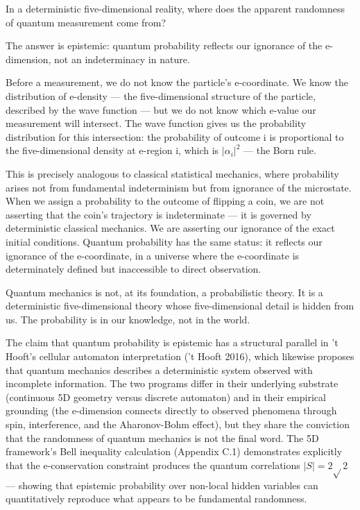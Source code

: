 \documentclass[aps,prd,preprint,superscriptaddress,longbibliography,floatfix]{revtex4-2}
\theoremstyle{remark}
\begin{document}
In a deterministic five-dimensional reality, where does the apparent randomness of quantum measurement come from?

The answer is epistemic: quantum probability reflects our ignorance of the e-dimension, not an indeterminacy in nature.

Before a measurement, we do not know the particle's e-coordinate. We know the distribution of e-density --- the five-dimensional structure of the particle, described by the wave function --- but we do not know which e-value our measurement will intersect. The wave function gives us the probability distribution for this intersection: the probability of outcome i is proportional to the five-dimensional density at e-region i, which is $|\alpha_{i}|^{2}$ --- the Born rule.

This is precisely analogous to classical statistical mechanics, where probability arises not from fundamental indeterminism but from ignorance of the microstate. When we assign a probability to the outcome of flipping a coin, we are not asserting that the coin's trajectory is indeterminate --- it is governed by deterministic classical mechanics. We are asserting our ignorance of the exact initial conditions. Quantum probability has the same status: it reflects our ignorance of the e-coordinate, in a universe where the e-coordinate is determinately defined but inaccessible to direct observation.

Quantum mechanics is not, at its foundation, a probabilistic theory. It is a deterministic five-dimensional theory whose five-dimensional detail is hidden from us. The probability is in our knowledge, not in the world.

The claim that quantum probability is epistemic has a structural parallel in 't Hooft's cellular automaton interpretation ('t Hooft 2016), which likewise proposes that quantum mechanics describes a deterministic system observed with incomplete information. The two programs differ in their underlying substrate (continuous 5D geometry versus discrete automaton) and in their empirical grounding (the e-dimension connects directly to observed phenomena through spin, interference, and the Aharonov-Bohm effect), but they share the conviction that the randomness of quantum mechanics is not the final word. The 5D framework's Bell inequality calculation (Appendix C.1) demonstrates explicitly that the e-conservation constraint produces the quantum correlations $|S| = 2\sqrt{}2$ --- showing that epistemic probability over non-local hidden variables can quantitatively reproduce what appears to be fundamental randomness.
\end{document}
